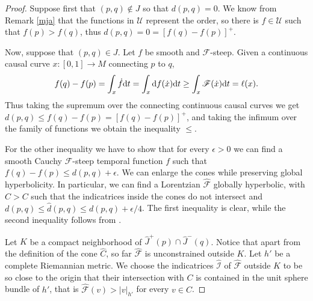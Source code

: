 \documentclass[a4paper]{jpconf}
\theoremstyle{definition}
\theoremstyle{remark}
\newcommand{\dd}{{\rm d}}
\begin{document}
\begin{proof}
Suppose first that $(p,q)\notin J$ so that $d(p,q)=0$. We know from Remark \ref{mja} that the functions in $\mathscr{U}$ represent the order, so there is $f\in \mathscr{U}$   such that $f(p)> f(q)$, thus $d(p,q)=0=[f(q)-f(p)]^+$.

Now, suppose that  $(p,q)\in J$.
Let $f$ be smooth and $\mathscr{F}$-steep.
Given a continuous causal curve $x\colon [0,1] \to M$ connecting $p$ to $q$,
\[
f(q)-f(p)=\int_x \dot f  \dd t=\int_x \dd f(\dot x)  \dd t \ge \int_x \mathscr{F}(\dot x)  \dd t= \ell(x).
\]
Thus taking the supremum over the connecting continuous causal curves we get $d(p,q) \le f(q)-f(p)= [f(q)-f(p)]^+$, and taking the infimum over the family of functions we obtain  the inequality $\le$.

For the other inequality we have to show that for every $\epsilon>0$ we can find a smooth Cauchy  $\mathscr{F}$-steep temporal function  $f$ such that $f(q)-f(p) \le d(p,q)+\epsilon$.
We can enlarge the cones while preserving global hyperbolicity. In particular, we can find a Lorentzian $\hat{\mathscr{F}}$ globally hyperbolic, with $\hat C>C$  such that the indicatrices inside the cones do not intersect and $d(p,q) \le \hat{d}(p,q)\le d(p,q)+ \epsilon/4$. The first inequality is clear, while the second inequality follows from \cite[Th.\ 58,59,61]{minguzzi17}.


Let $K$ be a compact neighborhood of $\hat J^+(p)\cap \hat J^{-}(q)$.
Notice that apart from the definition of the cone $\hat C$, so far  $\hat{\mathscr{F}}$ is unconstrained outside $K$. Let $h'$ be a complete Riemannian metric. We choose the indicatrices $\hat{\mathscr{I}}$ of $\hat{\mathscr{F}}$ outside $K$ to be so close to the origin  that their intersection with $C$ is contained in the unit sphere bundle of $h'$, that is $\hat{\mathscr{F}}(v)>\vert v\vert_{h'}$ for every $v\in C$.


\end{proof}
\end{document}
